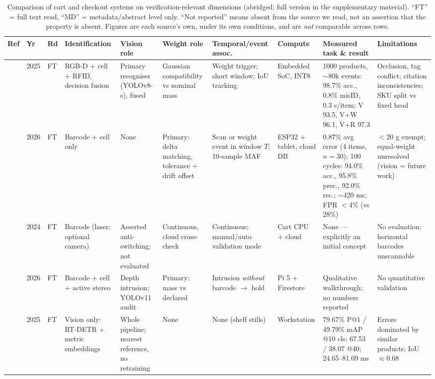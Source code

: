 \documentclass[conference]{IEEEtran}
\begin{document}
\begin{table}[!t]
\caption{Comparison of cart and checkout systems on verification-relevant dimensions (abridged; full
version in the supplementary material). ``FT'' = full text read, ``MD'' = metadata/abstract level
only. ``Not reported'' means absent from the source we read, not an assertion that the property is
absent. Figures are each source's own, under its own conditions, and are \emph{not} comparable across
rows.}
\label{tab:related}
\centering
\scriptsize
\renewcommand{\arraystretch}{1.15}
\begin{tabular}{@{}p{}p{}p{}p{}p{}p{}p{}p{}p{}p{}@{}}
\toprule
Ref & Yr & Rd & Identification & Vision role & Weight role & Temporal/event assoc. & Compute & Measured task \& result & Limitations \\
\midrule
\cite{R01} & 2025 & FT & RGB-D + cell + RFID, decision fusion & Primary recogniser (YOLOv8-s), fused & Gaussian compatibility vs nominal mass & Weight trigger; short window; IoU tracking & Embedded SoC, INT8 & 1000 products, $\sim$80k events: 98.7\% acc., 0.8\% misID, 0.3 s/item; V 93.5, V+W 96.1, V+R 97.3 & Occlusion, tag conflict; citation inconsistencies; SKU split vs fixed head \\
\cite{R02} & 2026 & FT & Barcode + cell only & None & Primary: delta matching, tolerance + drift offset & Scan or weight event in window $T$; 10-sample MAF & ESP32 + tablet, cloud DB & 0.87\% avg error (4 items, $n{=}30$); 100 cycles: 94.0\% acc., 95.8\% prec., 92.0\% rec.; $\sim$420 ms; FPR $<$4\% (vs 28\%) & $<$20 g exempt; equal-weight unresolved (vision = future work) \\
\cite{R03} & 2024 & FT & Barcode (laser; optional camera) & Asserted anti-switching; not evaluated & Continuous, cloud cross-check & Continuous; manual/auto validation mode & Cart CPU + cloud & None --- explicitly an initial concept & No evaluation; horizontal barcodes unscannable \\
\cite{R26} & 2026 & FT & Barcode + cell + active stereo & Depth intrusion; YOLOv11 audit & Primary: mass vs declared & Intrusion \emph{without} barcode $\rightarrow$ hold & Pi 5 + Firestore & Qualitative walkthrough; no numbers reported & No quantitative validation \\
\cite{R07} & 2025 & FT & Vision only: RT-DETR + metric embeddings & Whole pipeline; nearest reference, no retraining & None & None (shelf stills) & Workstation & 79.67\% P@1 / 49.79\% mAP @10 cls; 67.53 / 38.07 @40; 24.65--81.09 ms & Errors dominated by similar products; IoU $\approx$0.68 \\

\end{tabular}
\end{table}
\end{document}

